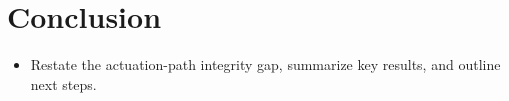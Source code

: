 \section{Conclusion}
\begin{itemize}
    \item Restate the actuation-path integrity gap, summarize key results, and outline next steps.
\end{itemize}